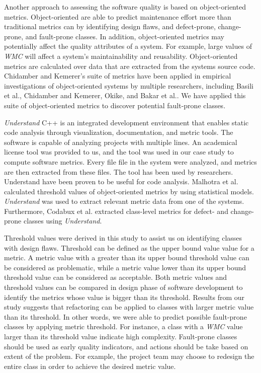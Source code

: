 Another approach to assessing the software quality is based on object-oriented metrics\cite{codabux2016technical}. Object-oriented are able to predict maintenance effort more than traditional metrics can\cite{li1993object} by identifying design flaws, and defect-prone, change-prone, and fault-prone classes\cite{basili1996validation}. In addition, object-oriented metrics may potentially affect the quality attributes of a system. For example, large values of \textit{WMC} will affect a system's maintainability and reusability\cite{quenelobject}. Object-oriented metrics are calculated over data that are extracted from the systems source code. Chidamber and Kemerer's suite of metrics have been applied in empirical investigations of object-oriented systems by multiple researchers, including Basili et al.\cite{basili1996validation}, Chidamber and Kemerer\cite{chidamber1994metrics}, Okike\cite{okike2010pedagogical}, and Bakar et al.\cite{bakar2014analysis}. We have applied this suite of object-oriented metrics to discover potential fault-prone classes.

\textit{Understand} C++ is an integrated development environment that enables static code analysis through visualization, documentation, and metric tools. The software is capable of analyzing projects with multiple lines. An academical license tool was provided to us, and the tool was used in our case study to compute software metrics. Every file file in the system were analyzed, and metrics are then extracted from these files. The tool has been used by researchers. Understand have been proven to be useful for code analysis. Malhotra et al.\cite{malhotra2015fault} calculated threshold values of object-oriented metrics by using statistical models. \textit{Understand} was used to extract relevant metric data from one of the systems. Furthermore, Codabux et al.\cite{codabux2016technical} extracted class-level metrics for defect- and change-prone classes using \textit{Understand}.

Threshold values were derived in this study to assist us on identifying classes with design flaws. Threshold can be defined as the upper bound value value for a metric. A metric value with a greater than its upper bound threshold value can be considered as problematic, while a metric value lower than its upper bound threshold value can be considered as acceptable. Both metric values and threshold values can be compared in design phase of software development to identify the metrics whose value is bigger than its threshold. Results from our study suggests that refactoring can be applied to classes with larger metric value than its threshold. In other words, we were able to predict possible fault-prone classes by applying metric threshold. For instance, a class with a \textit{WMC} value larger than its threshold value indicate high complexity. Fault-prone classes should be used as early quality indicators, and actions should be take based on extent of the problem. For example, the project team may choose to redesign the entire class in order to achieve the desired metric value. 


